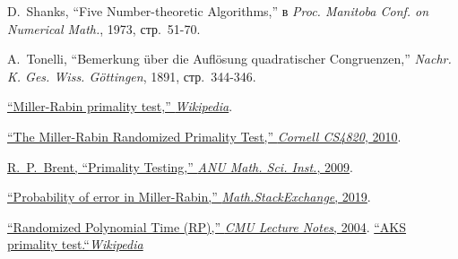 \documentclass[a4paper,12pt]{article}
\begin{document}
\begin{thebibliography}{}
D.~Shanks, ``Five Number-theoretic Algorithms,'' в \emph{Proc. Manitoba Conf. on Numerical Math.}, 1973, стр.~51-70.

A.~Tonelli, ``Bemerkung über die Auflösung quadratischer Congruenzen,''
\emph{Nachr. K. Ges. Wiss. Göttingen}, 1891, стр.~344-346.

\href{https://en.wikipedia.org/wiki/Miller%E2%80%93Rabin_primality_test}{``Miller-Rabin primality test,'' \emph{Wikipedia}}.

\href{https://www.cs.cornell.edu/courses/cs4820/2010sp/handouts/MillerRabin.pdf}{``The Miller-Rabin Randomized Primality Test,'' \emph{Cornell CS4820}, 2010}.

\href{https://maths-people.anu.edu.au/~brent/pd/comp4600_primality.pdf}{R.~P.~Brent, ``Primality Testing,'' \emph{ANU Math. Sci. Inst.}, 2009}.

\href{https://math.stackexchange.com/questions/4202451/miller-rabin-primality-accuracy}{``Probability of error in Miller-Rabin,'' \emph{Math.StackExchange}, 2019}.

\href{https://www.cs.cmu.edu/afs/cs/academic/class/15859-f04/www/scribes/lec2.pdf}{``Randomized Polynomial Time (RP),'' \emph{CMU Lecture Notes}, 2004}.
\href{https://en.m.wikipedia.org/wiki/AKS_primality_test}{``AKS primality test.``\emph{Wikipedia}}

\end{thebibliography}
\end{document}
